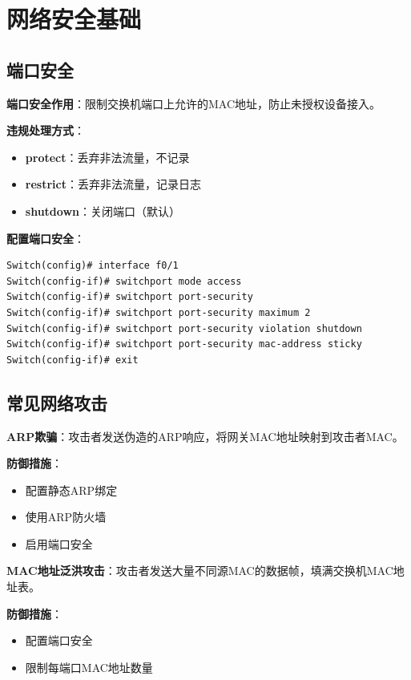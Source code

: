 \documentclass[12pt,a4paper]{ctexart}
\begin{document}
\section{网络安全基础}

\subsection{端口安全}

\begin{keybox}
\textbf{端口安全作用}：限制交换机端口上允许的MAC地址，防止未授权设备接入。

\textbf{违规处理方式}：
\begin{itemize}[itemsep=0pt]
    \item \textbf{protect}：丢弃非法流量，不记录
    \item \textbf{restrict}：丢弃非法流量，记录日志
    \item \textbf{shutdown}：关闭端口（默认）
\end{itemize}
\end{keybox}

\begin{cmdbox}
\textbf{配置端口安全}：
\begin{lstlisting}
Switch(config)# interface f0/1
Switch(config-if)# switchport mode access
Switch(config-if)# switchport port-security
Switch(config-if)# switchport port-security maximum 2
Switch(config-if)# switchport port-security violation shutdown
Switch(config-if)# switchport port-security mac-address sticky
Switch(config-if)# exit
\end{lstlisting}
\end{cmdbox}

\subsection{常见网络攻击}

\begin{keybox}
\textbf{ARP欺骗}：攻击者发送伪造的ARP响应，将网关MAC地址映射到攻击者MAC。

\textbf{防御措施}：
\begin{itemize}[itemsep=0pt]
    \item 配置静态ARP绑定
    \item 使用ARP防火墙
    \item 启用端口安全
\end{itemize}

\textbf{MAC地址泛洪攻击}：攻击者发送大量不同源MAC的数据帧，填满交换机MAC地址表。

\textbf{防御措施}：
\begin{itemize}[itemsep=0pt]
    \item 配置端口安全
    \item 限制每端口MAC地址数量
\end{itemize}
\end{keybox}
\end{document}
